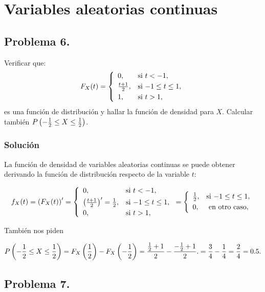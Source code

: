 \documentclass[
]{article}
\begin{document}
\section{Variables aleatorias
continuas}\label{variables-aleatorias-continuas}

\subsection{Problema 6.}\label{problema-6.}

Verificar que: \[
F_X (t)=
\left\{\begin{array}{ll}
0, & \mbox{si $t<-1$},
 \\[0.1cm]
{t+1\over 2}, & \mbox{si $-1\leq
t\leq 1$},
 \\[0.1cm]
1, & \mbox{si $t> 1$},
\end{array}\right.
\] es una función de distribución y hallar la función de densidad para
\(X\). Calcular también
\(P\left(-{1\over 2}\leq X\leq {1\over 2}\right)\).

\subsubsection{Solución}\label{soluciuxf3n-5}

La función de densidad de variables aleatorias continuas se puede
obtener derivando la función de distribución respecto de la variable
\(t\):

\[
f_X(t)=\left(F_X (t)\right)'=
\left\{\begin{array}{ll}
0, & \mbox{si $t<-1$},
 \\[0.1cm]
\left({t+1\over 2}\right)'=\frac12, & \mbox{si $-1\leq
t\leq 1$},
 \\[0.1cm]
0, & \mbox{si $t> 1$},
\end{array}\right.=
\left\{\begin{array}{ll}
\frac12, & \mbox{si $-1\leq
t\leq 1$},
 \\[0.1cm]
0, & \mbox{ en otro caso},
\end{array}\right.
\]

También nos piden

\[P\left(-{1\over 2}\leq X\leq {1\over 2}\right)=F_X\left(\frac12\right)-F_X\left(-\frac12\right)=\frac{\frac12+1}{2}-\frac{-\frac12+1}{2}.=\frac34-\frac14=\frac24=0.5.\]

\subsection{Problema 7.}\label{problema-7.}
\end{document}
